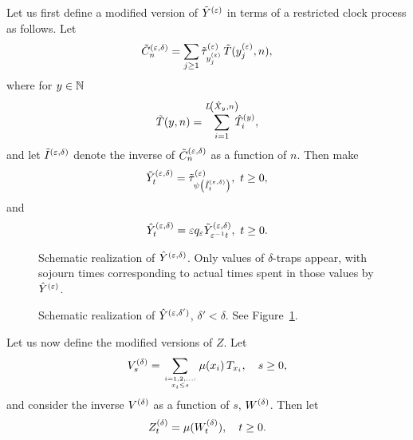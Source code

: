 Let us first define a modified version of $\tilde Y^{(\varepsilon)}$ in terms of a restricted clock process as follows. Let
\begin{equation}
\label{eq:rclock}
\tilde C^{(\eps,\d)}_n=\sum_{j\geq1} \tilde\tau_{\yep_j}^{(\eps)}\,\tilde T(\yep_j,n),
\end{equation}
where for $y\in{\mathbb N}$
\begin{equation}
\label{eq:tilt}
\tilde T(y,n)=\sum_{i=1}^{L\!\left(\txt_{y},n\right)}\!\!\!\hat T^{(y)}_i,
\end{equation}
and let $\tilde I^{(\varepsilon,\delta)}$ denote the inverse of $\tilde C^{(\varepsilon,\delta)}_n$ as a 
function of $n$. Then make 
\begin{equation}
\label{eq:byed}
\tilde Y^{(\eps,\d)}_t=%
\tilde\tau^{(\eps)}_{\psi\left(\tilde I^{(\eps,\d)}_t\right)},\,\,t\geq0,
\end{equation}
and
\begin{equation}
\label{eq:hyed}
\hat Y^{(\eps,\d)}_t=%
\eps q_\eps\tilde Y^{(\eps,\d)}_{\eps^{-1}t},\,\,t\geq0.
\end{equation}







\begin{figure}[htb]
\begin{center}

\end{center}
\caption{Schematic realization of $\hat Y^{(\varepsilon,\delta)}$. Only values of $\delta$-traps appear, with sojourn times corresponding to
actual times spent in those values by $\hat Y^{(\varepsilon)}$.}
\label{tyed}
\end{figure}


\begin{figure}[htb]
\begin{center}

\end{center}
\caption{Schematic realization of $\hat Y^{(\varepsilon,\delta')}$, $\delta'<\delta$. See Figure~\ref{tyed}.}
\label{tyedp}
\end{figure}



















Let us now define the modified versions of $Z$. Let
\begin{equation}
\label{eq:c4}
\bvd_s=\sum_{i=1,2,\ldots:\atop{x_i\leq s}}\mu(x_i)\,T_{x_i},\quad s\geq0,
\end{equation}
and consider the inverse $V^{(\delta)}$ as a function of $s$, $W^{(\delta)}$. Then let
\begin{equation}
\label{eq:c5}
\bzd_t=\mu(\bwd_t),\quad t\geq0.
\end{equation}






